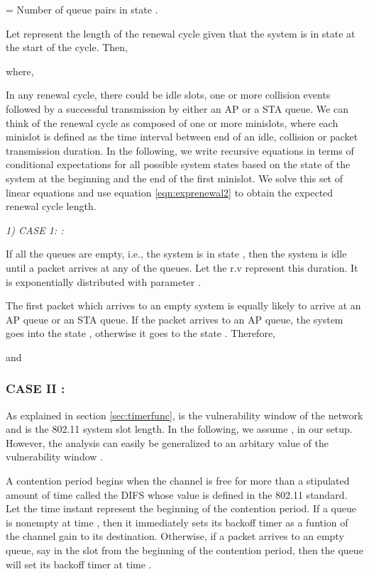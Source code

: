 \documentclass[10pt,conference]{IEEEtran}
\begin{document}
 = Number of queue pairs in state .


Let  represent the length of the renewal cycle given that the system is in state  at the start of the cycle. Then,

   
  where,



In any renewal cycle, there could be idle slots, one or more collision events followed by a successful transmission by either an AP or a STA queue.
 We can think of the renewal cycle as composed of one or more minislots, where each minislot is defined as the time interval between end of an idle, collision or  packet transmission duration.
 In the following, we write recursive equations in terms of conditional expectations  for all possible system states  based on the state of the system at 
the beginning and the end of the first minislot. 
We solve this set of linear equations and use equation \ref{eqn:exprenewal2} to obtain the expected renewal cycle length.

 \emph{1) CASE 1: :}

  If all the queues are empty, i.e., the system is in state , then the system is idle until a packet arrives at any of the queues.
 Let the r.v  represent this duration. It is exponentially distributed with parameter .

The first packet which arrives to an empty system is equally likely to arrive at an AP queue or an STA queue. If the packet arrives to an AP queue, the system goes into the state , otherwise it goes to the 
state .
 Therefore,
   
and


\subsubsection{CASE II :}
As explained in section \ref{sec:timerfunc},  is the vulnerability window of the network and  is the 802.11 system slot length. In the following, we assume , in our setup.
However, the analysis can easily be generalized to an arbitary value of the vulnerability window .

 A contention period begins when the channel is free for more than a stipulated amount of time called the DIFS whose value is defined in the 802.11 standard. Let the time instant  represent the beginning of the contention period. 
 If a queue is nonempty at time , then it immediately sets its backoff timer as a funtion of the channel gain to its destination. Otherwise, if a packet arrives to an empty queue, say in the   slot from the beginning of the contention period,
 then the queue will set its backoff timer at time . 
\end{document}
